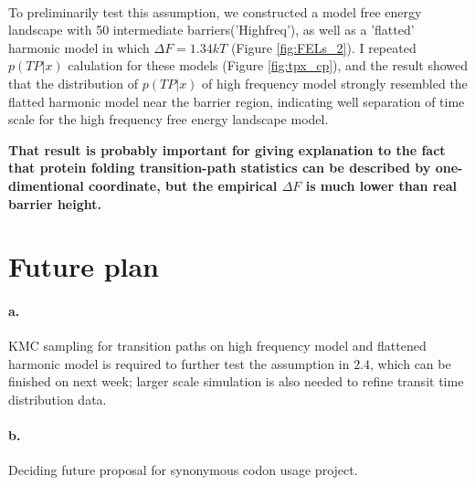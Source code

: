\documentclass[11pt, a4paper]{article}
\begin{document}
\paragraph{}To preliminarily test this assumption, we constructed a model free energy landscape with 50 intermediate barriers('Highfreq'), as well as a 'flatted' harmonic model in which $\Delta F= 1.34 kT$ (Figure \ref{fig:FELs_2}).
I repeated $p(TP|x)$ calulation for these models (Figure \ref{fig:tpx_cp}), and the result showed that the distribution of $p(TP|x)$ of high frequency model strongly resembled the flatted harmonic model near the barrier region,
 indicating well separation of time scale for the high frequency free energy landscape model.

\textbf{That result is probably important for giving explanation to the fact that protein folding transition-path statistics can be described
 by one-dimentional coordinate, but the empirical $\Delta F$ is much lower than real barrier height.}

\section{Future plan}

\paragraph{a.} KMC sampling for transition paths on high frequency model and flattened harmonic model is required to further test the assumption in $2.4$, which can be finished on next week; larger scale simulation is also needed to refine transit time distribution data.
\paragraph{b.} Deciding future proposal for synonymous codon usage project.



\small


\end{document}
